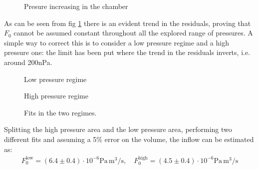 \documentclass[11pt,a4 paper]{article}
\begin{document}
\begin{figure}[H]
  \centering
   \hspace{-0.05\textwidth}
  \caption{Presure increasing in the chamber}
  \label{fig:increase_all}
\end{figure}

As can be seen from fig \ref{fig:increase_all} there is an evident trend in the residuals, proving that $F_0$ cannot be assumed constant throughout all the explored range of pressures. A simple way to correct this is to consider a low pressure regime and a high pressure one: the limit has been put where the trend in the residuals inverts, i.e. around 200\si{\nano\pascal}.

\begin{figure}[H]
  \centering
   \hspace{-0.05\textwidth}
  \caption{Low pressure regime}
  \label{fig:increase_lowP}
\end{figure}

\begin{figure}[H]
  \centering
   \hspace{-0.05\textwidth}
  \caption{High pressure regime}
  \label{fig:increase_highP}
\end{figure}


\begin{figure}[H]
  \centering
  \caption{Fits in the two regimes.}
  \label{fig:increase_combined}
\end{figure}



Splitting the high pressure area and the low pressure area, performing two different fits and assuming a 5\% error on the volume, the inflow can be estimated as:
\begin{gather*}
  F_0^\text{low} = (6.4 \pm 0.4) \cdot 10^{-6} \si{\pascal}\, \si{\metre^3}/\si{\second}, \quad
  F_0^\text{high} = (4.5 \pm 0.4) \cdot 10^{-6} \si{\pascal}\, \si{\metre^3}/\si{\second}
\end{gather*}
\end{document}
